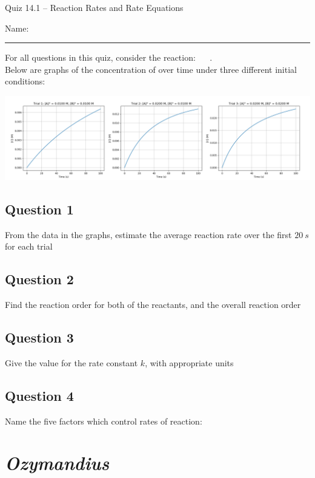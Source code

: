 \documentclass[11pt, letterpaper]{memoir}
\begin{document}
	\begin{center}
		{\large	Quiz 14.1 -- Reaction Rates and Rate Equations}
	\end{center}
	{\large Name: \rule[-1mm]{4in}{.1pt} 
	
	\noindent
	For all questions in this quiz, consider the reaction: ~~ . \\Below are graphs of the concentration of  over time under three different initial conditions:
	
	\noindent \hspace{-2em} \includegraphics[width=1.1\linewidth]{Initial_Rates} 
	
	\subsection*{Question 1}
	From the data in the graphs, estimate the average reaction rate over the first $20~s$ for each trial
	
	\vspace{5em}
	\subsection*{Question 2}
	Find the reaction order for both of the reactants, and the overall reaction order
	
	\vspace{5em}
	\subsection*{Question 3}
	Give the value for the rate constant $k$, with appropriate units
	
	\vspace{5em}
	\subsection*{Question 4}
	Name the five factors which control rates of reaction:
	
	\newpage
	\pagestyle{empty}
	\addtocounter{page}{-1}
	\section*{\emph{Ozymandius}}
}
\end{document}
